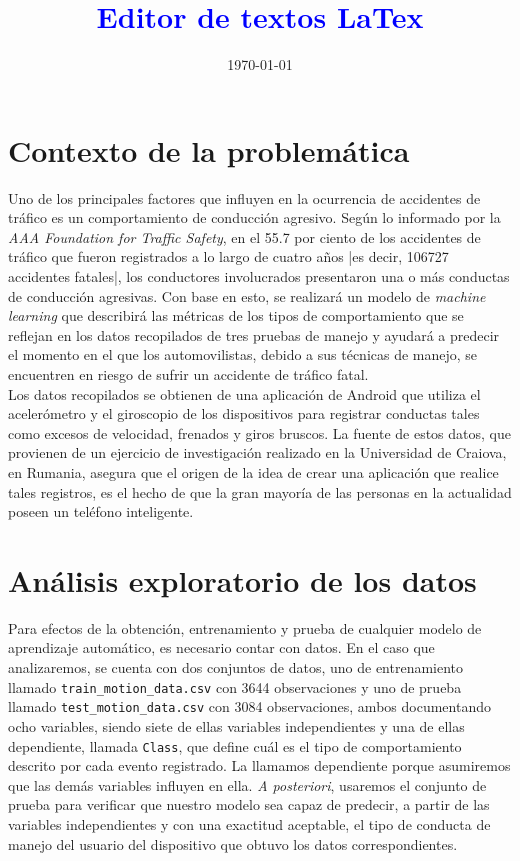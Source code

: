 \documentclass[spanish,12pt,letterpaper]{article}
\title{\textcolor{blue}{Editor de textos LaTex}}
\date{\today}
\begin{document}
\tableofcontents
\listoffigures
\listoftables

\newpage
\section{Contexto de la problemática}

\textsc Uno de los principales factores que influyen en la ocurrencia de accidentes de tráfico es un comportamiento de conducción agresivo. Según lo informado por la \textit{AAA Foundation for Traffic Safety}, en el 55.7 por ciento de los accidentes de tráfico que fueron registrados a lo largo de cuatro años |es decir, 106727 accidentes fatales|, los conductores involucrados presentaron una o más conductas de conducción agresivas. Con base en esto, se realizará un modelo de \textit{machine learning} que describirá las métricas de los tipos de comportamiento que se reflejan en los datos recopilados de tres pruebas de manejo y ayudará a predecir el momento en el que los automovilistas, debido a sus técnicas de manejo, se encuentren en riesgo de sufrir un accidente de tráfico fatal. \\

\textsc Los datos recopilados se obtienen de una aplicación de Android que utiliza el acelerómetro y el giroscopio de los dispositivos para registrar conductas tales como excesos de velocidad, frenados y giros bruscos. La fuente de estos datos, que provienen de un ejercicio de investigación realizado en la Universidad de Craiova, en Rumania, asegura que el origen de la idea de crear una aplicación que realice tales registros, es el hecho de que la gran mayoría de las personas en la actualidad poseen un teléfono inteligente. \\

\section{Análisis exploratorio de los datos}

\textsc Para efectos de la obtención, entrenamiento y prueba de cualquier modelo de aprendizaje automático, es necesario contar con datos. En el caso que analizaremos, se cuenta con dos conjuntos de datos, uno de entrenamiento llamado \verb|train_motion_data.csv| con 3644 observaciones y uno de prueba llamado \verb|test_motion_data.csv| con 3084 observaciones, ambos documentando ocho variables, siendo siete de ellas variables independientes y una de ellas dependiente, llamada \verb|Class|, que define cuál es el tipo de comportamiento descrito por cada evento registrado. La llamamos dependiente porque asumiremos que las demás variables influyen en ella. \textit{A posteriori}, usaremos el conjunto de prueba para verificar que nuestro modelo sea capaz de predecir, a partir de las variables independientes y con una exactitud aceptable, el tipo de conducta de manejo del usuario del dispositivo que obtuvo los datos correspondientes. \\
\end{document}
